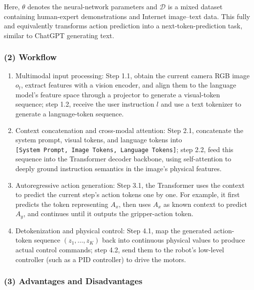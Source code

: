 Here, \(\theta\) denotes the neural-network parameters and \(\mathcal{D}\) is a mixed dataset containing human-expert demonstrations and Internet image--text data. This fully and equivalently transforms action prediction into a next-token-prediction task, similar to ChatGPT generating text.

\hypertarget{workflow-2}{%
\subsubsection{(2) Workflow}\label{workflow-2}}

\begin{enumerate}
\def\labelenumi{\arabic{enumi}.}
\item
  Multimodal input processing: Step 1.1, obtain the current camera RGB image \(o_t\), extract features with a vision encoder, and align them to the language model's feature space through a projector to generate a visual-token sequence; step 1.2, receive the user instruction \(l\) and use a text tokenizer to generate a language-token sequence.
\item
  Context concatenation and cross-modal attention: Step 2.1, concatenate the system prompt, visual tokens, and language tokens into \texttt{{[}System\ Prompt,\ Image\ Tokens,\ Language\ Tokens{]}}; step 2.2, feed this sequence into the Transformer decoder backbone, using self-attention to deeply ground instruction semantics in the image's physical features.
\item
  Autoregressive action generation: Step 3.1, the Transformer uses the context to predict the current step's action tokens one by one. For example, it first predicts the token representing \(A_x\), then uses \(A_x\) as known context to predict \(A_y\), and continues until it outputs the gripper-action token.
\item
  Detokenization and physical control: Step 4.1, map the generated action-token sequence \((z_1,\ldots,z_K)\) back into continuous physical values to produce actual control commands; step 4.2, send them to the robot's low-level controller (such as a PID controller) to drive the motors.
\end{enumerate}

\hypertarget{advantages-and-disadvantages}{%
\subsubsection{(3) Advantages and Disadvantages}\label{advantages-and-disadvantages}}


